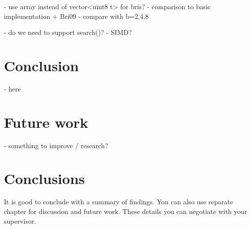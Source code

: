  - use array instead of vector<uint8 t> for bris?
- comparison to basic implementation + Bri09
  - compare with b=2,4,8

 - do we need to support search()?
 - SIMD?


\chapter{Conclusion}
 - here

\chapter{Future work}
 - something to improve / research?

\chapter{Conclusions\label{chapter:conclusions}}

It is good to conclude with a summary of findings. You can also use separate chapter for discussion and future work. These details you can negotiate with your supervisor.
